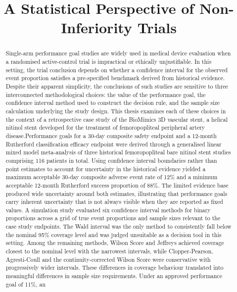 \documentclass{article}
\title{A Statistical Perspective of Non-Inferiority Trials}
\author{
  }
\begin{document}
\maketitle


\begin{abstract}
Single-arm performance goal studies are widely used in medical device
evaluation when a randomised active-control trial is impractical or
ethically unjustifiable. In this setting, the trial conclusion depends
on whether a confidence interval for the observed event proportion
satisfies a pre-specified benchmark derived from historical evidence.
Despite their apparent simplicity, the conclusions of such studies are
sensitive to three interconnected methodological choices: the value of
the performance goal, the confidence interval method used to construct
the decision rule, and the sample size calculation underlying the study
design. This thesis examines each of these choices in the context of a
retrospective case study of the BioMimics 3D vascular stent, a helical
nitinol stent developed for the treatment of femoropopliteal peripheral
artery disease.Performance goals for a 30-day composite safety endpoint
and a 12-month Rutherford classification efficacy endpoint were derived
through a generalised linear mixed model meta-analysis of three
historical femoropopliteal bare nitinol stent studies comprising 116
patients in total. Using confidence interval boundaries rather than
point estimates to account for uncertainty in the historical evidence
yielded a maximum acceptable 30-day composite adverse event rate of 12\%
and a minimum acceptable 12-month Rutherford success proportion of 88\%.
The limited evidence base produced wide uncertainty around both
estimates, illustrating that performance goals carry inherent
uncertainty that is not always visible when they are reported as fixed
values. A simulation study evaluated six confidence interval methods for
binary proportions across a grid of true event proportions and sample
sizes relevant to the case study endpoints. The Wald interval was the
only method to consistently fall below the nominal 95\% coverage level
and was judged unsuitable as a decision tool in this setting. Among the
remaining methods, Wilson Score and Jeffreys achieved coverage closest
to the nominal level with the narrowest intervals, while
Clopper-Pearson, Agresti-Coull and the continuity-corrected Wilson Score
were conservative with progressively wider intervals. These differences
in coverage behaviour translated into meaningful differences in sample
size requirements. Under an approved performance goal of 11\%, an

\end{abstract}
\end{document}
